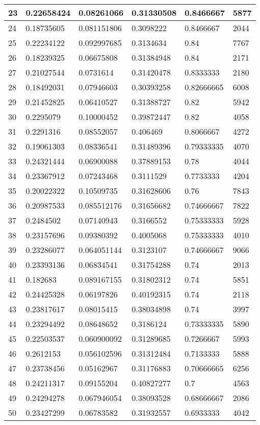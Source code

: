 \begin{longtable}{|l|l|l|l|l|l|}
23 & 0.22658424 & 0.08261066 & 0.31330508 & 0.8466667 & 5877 \\ \hline 
24 & 0.18735605 & 0.081151806 & 0.3098222 & 0.8466667 & 2044 \\ \hline 
25 & 0.22234122 & 0.092997685 & 0.3134634 & 0.84 & 7767 \\ \hline 
26 & 0.18239325 & 0.06675808 & 0.31384948 & 0.84 & 2171 \\ \hline 
27 & 0.21027544 & 0.0731614 & 0.31420478 & 0.8333333 & 2180 \\ \hline 
28 & 0.18492031 & 0.07946603 & 0.30393258 & 0.82666665 & 6008 \\ \hline 
29 & 0.21452825 & 0.06410527 & 0.31388727 & 0.82 & 5942 \\ \hline 
30 & 0.2295079 & 0.10000452 & 0.39872447 & 0.82 & 4058 \\ \hline 
31 & 0.2291316 & 0.08552057 & 0.406469 & 0.8066667 & 4272 \\ \hline 
32 & 0.19061303 & 0.08336541 & 0.31489396 & 0.79333335 & 4070 \\ \hline 
33 & 0.24321444 & 0.06900088 & 0.37889153 & 0.78 & 4044 \\ \hline 
34 & 0.23367912 & 0.07243468 & 0.3111529 & 0.7733333 & 4204 \\ \hline 
35 & 0.20022322 & 0.10509735 & 0.31628606 & 0.76 & 7843 \\ \hline 
36 & 0.20987533 & 0.085512176 & 0.31656682 & 0.74666667 & 7822 \\ \hline 
37 & 0.2484502 & 0.07140943 & 0.3166552 & 0.75333333 & 5928 \\ \hline 
38 & 0.23157696 & 0.09380392 & 0.4005068 & 0.75333333 & 4010 \\ \hline 
39 & 0.23286077 & 0.064051144 & 0.3123107 & 0.74666667 & 9066 \\ \hline 
40 & 0.23393136 & 0.06834541 & 0.31754288 & 0.74 & 2013 \\ \hline 
41 & 0.182683 & 0.089167155 & 0.31802312 & 0.74 & 5851 \\ \hline 
42 & 0.24425328 & 0.06197826 & 0.40192315 & 0.74 & 2118 \\ \hline 
43 & 0.23817617 & 0.08015415 & 0.38034898 & 0.74 & 3997 \\ \hline 
44 & 0.23294492 & 0.08648652 & 0.3186124 & 0.73333335 & 5890 \\ \hline 
45 & 0.22503537 & 0.060900092 & 0.31289685 & 0.7266667 & 5993 \\ \hline 
46 & 0.2612153 & 0.056102596 & 0.31312484 & 0.7133333 & 5888 \\ \hline 
47 & 0.23738456 & 0.05162967 & 0.31176883 & 0.70666665 & 6256 \\ \hline 
48 & 0.24211317 & 0.09155204 & 0.40827277 & 0.7 & 4563 \\ \hline 
49 & 0.24294278 & 0.067946054 & 0.38093528 & 0.68666667 & 2086 \\ \hline 
50 & 0.23427299 & 0.06783582 & 0.31932557 & 0.6933333 & 4042 \\ \hline 
\end{longtable}